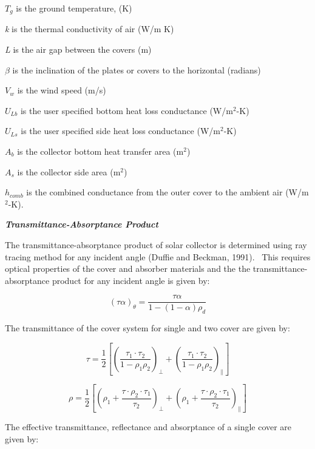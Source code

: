 \(T_{g}\) is the ground temperature, (K)

\emph{k} is the thermal conductivity of air (W/m K)

\emph{L} is the air gap between the covers (m)

\(\beta\) is the inclination of the plates or covers to the horizontal (radians)

\(V_{w}\) is the wind speed (m/s)

\(U_{Lb}\) is the user specified bottom heat loss conductance (W/m\(^{2}\)-K)

\(U_{Ls}\) is the user specified side heat loss conductance (W/m\(^{2}\)-K)

\(A_{b}\) is the collector bottom heat transfer area (m\(^{2}\))

\(A_{s}\) is the collector side area (m\(^{2}\))

\(h_{comb}\) is the combined conductance from the outer cover to the ambient air (W/m\(^{2}\)-K).

\textbf{\emph{Transmittance-Absorptance Product}}

The transmittance-absorptance product of solar collector is determined using ray tracing method for any incident angle (Duffie and Beckman, 1991).~ This requires optical properties of the cover and absorber materials and the the transmittance-absorptance product for any incident angle is given by:

\begin{equation}
{\left( {\tau \alpha } \right)_\theta } = \frac{{\tau \alpha }}{{1 - \left( {1 - \alpha } \right){\rho_d}}}
\end{equation}

The transmittance of the cover system for single and two cover are given by:

\begin{equation}
\tau  = \frac{1}{2}\left[ {{{\left( {\frac{{{\tau_1} \cdot {\tau_2}}}{{1 - {\rho_1}{\rho_2}}}} \right)}_ \bot } + {{\left( {\frac{{{\tau_1} \cdot {\tau_2}}}{{1 - {\rho_1}{\rho_2}}}} \right)}_\parallel }} \right]
\end{equation}

\begin{equation}
\rho  = \frac{1}{2}\left[ {{{\left( {{\rho_1} + \frac{{\tau  \cdot {\rho_2} \cdot {\tau_1}}}{{{\tau_2}}}} \right)}_ \bot } + {{\left( {{\rho_1} + \frac{{\tau  \cdot {\rho_2} \cdot {\tau_1}}}{{{\tau_2}}}} \right)}_\parallel }} \right]
\end{equation}

The effective transmittance, reflectance and absorptance of a single cover are given by:

